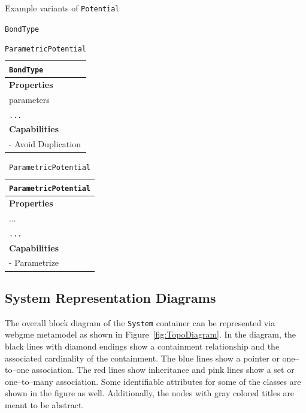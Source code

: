 \documentclass[12pt]{article}
\begin{document}
\begin{table}[ht]
    \centering
    \caption{Example variants of \texttt{Potential}}
    \label{tab:ExampleConnections}
    \begin{subtable}[h]{0.45\textwidth}
    \centering
    \caption{\texttt{BondType}}

    \begin{tabular}{|l|}
         \hline
         \rowcolor{gray!50}
         \texttt{BondType}  \\
         \hline
         \textbf{Properties}\\
         \hline
         parameters\\
         \texttt{...}\\
         \hline
         \textbf{Capabilities}\\
         \hline
         - Avoid Duplication \\

        \hline
    \end{tabular}
    \end{subtable}
    \hfill
    \begin{subtable}[h]{0.45\textwidth}
       \caption{\texttt{ParametricPotential}}
       \centering
    \begin{tabular}{|l|}
         \hline
         \rowcolor{gray!50}
         \texttt{ParametricPotential}  \\
         \hline

         \textbf{Properties}\\
         \hline
            ...\\
         \texttt{...}\\
         \hline
         \textbf{Capabilities}\\
         \hline
         - Parametrize\\
        \hline
    \end{tabular}
    \end{subtable}
\end{table}


\pagebreak
\subsection{System Representation Diagrams}
The overall block diagram of the \texttt{System} container can be represented via webgme metamodel as shown in Figure~\ref{fig:TopoDiagram}. In the diagram, the black lines with diamond endings show a containment relationship and the associated cardinality of the containment. The blue lines show a pointer or one--to--one association. The red lines show inheritance and pink lines show a set or one--to--many association. Some identifiable attributes for some of the classes are shown in the figure as well. Additionally, the nodes with gray colored titles are meant to be abstract.
\end{document}
